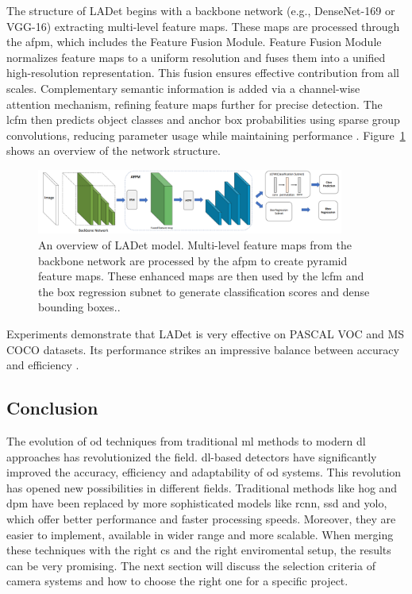 \begin{enumerate}
     The structure of LADet begins with a backbone network (e.g., DenseNet-169 or VGG-16) extracting multi-level feature maps. These maps are processed through the \gls{afpm}, which includes the Feature Fusion Module. Feature Fusion Module normalizes feature maps to a uniform resolution and fuses them into a unified high-resolution representation. This fusion ensures effective contribution from all scales. Complementary semantic information is added via a channel-wise attention mechanism, refining feature maps further for precise detection. The \gls{lcfm} then predicts object classes and anchor box probabilities using sparse group convolutions, reducing parameter usage while maintaining performance \cite{LADet}. Figure~\ref{LADet} shows an overview of the network structure.

     \begin{figure}[ht]
        \centering
        \includegraphics[width=0.9\textwidth]{Figures/LADet.PNG} 
        \caption{An overview of LADet model. Multi-level feature maps from the backbone network are processed by the \gls{afpm} to create pyramid feature maps. These enhanced maps are then used by the \gls{lcfm} and the box regression subnet to generate classification scores and dense bounding boxes.\cite{LADet}.}
        \label{LADet}
    \end{figure}

     Experiments demonstrate that LADet is very effective on PASCAL VOC and MS COCO datasets. Its performance strikes an impressive balance between accuracy and efficiency \cite{LADet}.
     
\end{enumerate}

\subsection{Conclusion}
The evolution of \gls{od} techniques from traditional \gls{ml} methods to modern \gls{dl} approaches has revolutionized the field. \gls{dl}-based detectors have significantly improved the accuracy, efficiency and adaptability of \gls{od} systems. This revolution has opened new possibilities in different fields. Traditional methods like \gls{hog} and \gls{dpm} have been replaced by more sophisticated models like \gls{rcnn}, \gls{ssd} and \gls{yolo}, which offer better performance and faster processing speeds. Moreover, they are easier to implement, available in wider range and more scalable. When merging these techniques with the right \gls{cs} and the right enviromental setup, the results can be very promising. The next section will discuss the selection criteria of camera systems and how to choose the right one for a specific project.

